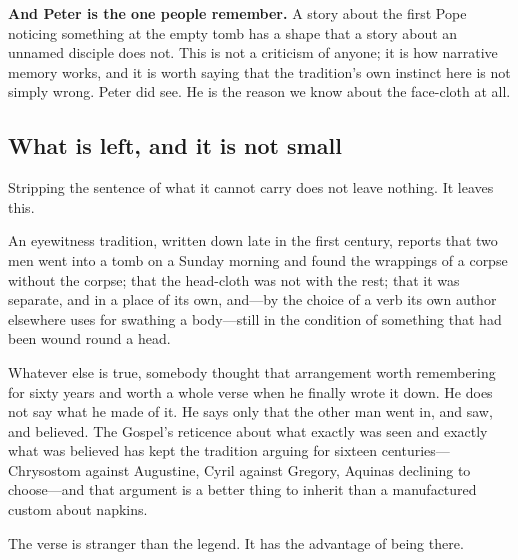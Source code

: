 \textbf{And Peter is the one people remember.} A story about the first Pope
noticing something at the empty tomb has a shape that a story about an unnamed
disciple does not. This is not a criticism of anyone; it is how narrative
memory works, and it is worth saying that the tradition's own instinct here is
not simply wrong. Peter did see. He is the reason we know about the face-cloth
at all.

\subsection{What is left, and it is not small}

Stripping the sentence of what it cannot carry does not leave nothing. It leaves
this.

An eyewitness tradition, written down late in the first century, reports that
two men went into a tomb on a Sunday morning and found the wrappings of a corpse
without the corpse; that the head-cloth was not with the rest; that it was
separate, and in a place of its own, and---by the choice of a verb its own
author elsewhere uses for swathing a body---still in the condition of something
that had been wound round a head.

Whatever else is true, somebody thought that arrangement worth remembering for
sixty years and worth a whole verse when he finally wrote it down. He does not
say what he made of it. He says only that the other man went in, and saw, and
believed. The Gospel's reticence about what exactly was seen and exactly what
was believed has kept the tradition arguing for sixteen centuries---Chrysostom
against Augustine, Cyril against Gregory, Aquinas declining to choose---and that
argument is a better thing to inherit than a manufactured custom about napkins.

The verse is stranger than the legend. It has the advantage of being there.
